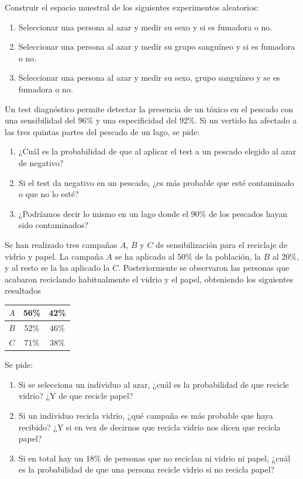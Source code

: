 {Construir el espacio muestral de los siguientes experimentos aleatorios:
\begin{enumerate}
\item Seleccionar una persona al azar y medir su sexo y si es fumadora o no. 
\item Seleccionar una persona al azar y medir su grupo sanguíneo y si es fumadora o no.
\item Seleccionar una persona al azar y medir su sexo, grupo sanguíneo y se es fumadora o no.
\end{enumerate}
}
{}
{}


{Un test diagnóstico permite detectar la presencia de un tóxico en el pescado con una sensibilidad del 96\% y una especificidad del 92\%. Si un vertido ha afectado a las tres quintas partes del pescado de un lago, se pide:
\begin{enumerate}
\item ¿Cuál es la probabilidad de que al aplicar el test a un pescado  elegido al azar de negativo?
\item Si el test da negativo en un pescado, ¿es más probable que esté contaminado o que no lo esté?
\item ¿Podríamos decir lo mismo en un lago donde el 90\% de los pescados hayan sido contaminados?
\end{enumerate}
}
{}
{}


{Se han realizado tres campañas $A$, $B$ y $C$ de sensibilización para el reciclaje de vidrio y papel. La campaña $A$ se ha aplicado al 50\% de la población, la $B$ al 20\%, y al resto se la ha aplicado la $C$. Posteriormente se observaron las personas que acabaron reciclando habitualmente el vidrio y el papel, obteniendo los siguientes resultados
\begin{center}
\begin{tabular}{|c|c|c|}
\hline
$A$ & 56\% & 42\% \\
\hline
$B$ & 52\% & 46\% \\
\hline
$C$ & 71\% & 38\% \\
\hline
\end{tabular}
\end{center}
Se pide:
\begin{enumerate}
\item Si se selecciona un individuo al azar, ¿cuál es la probabilidad de que recicle vidrio? ¿Y de que recicle papel?
\item Si un individuo recicla vidrio, ¿qué campaña es más probable que haya recibido? ¿Y si en vez de decirnos que recicla vidrio nos dicen que recicla papel?
\item Si en total hay un 18\% de personas que no reciclan ni vidrio ni papel, ¿cuál es la probabilidad de que una persona recicle vidrio si no recicla papel?
\end{enumerate}
}
{}
{}


